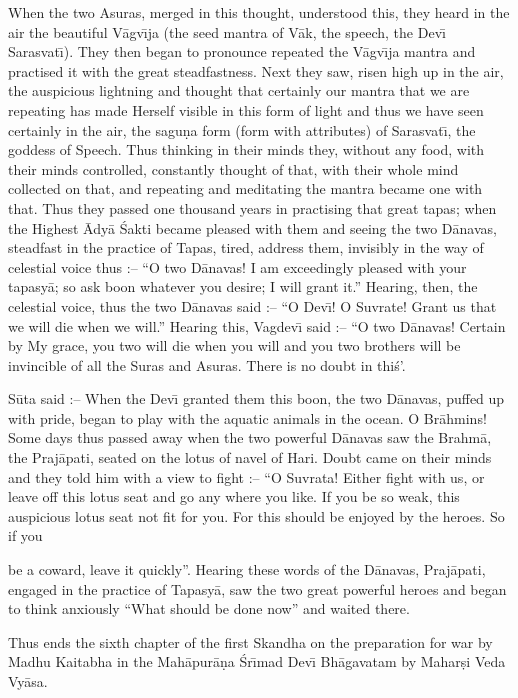 When the two Asuras, merged in this thought, understood this, they heard in the air the beautiful V\=agv\={\i}ja (the seed mantra of V\=ak, the speech, the Dev\={\i} Sarasvat\={\i}). They then began to pronounce repeated the V\=agv\={\i}ja mantra and practised it with the great steadfastness. Next they saw, risen high up in the air, the auspicious lightning and thought that certainly our mantra that we are repeating has made Herself visible in this form of light and thus we have seen certainly in the air, the sagu\d{n}a form (form with attributes) of Sarasvat\={\i}, the goddess of Speech. Thus thinking in their minds they, without any food, with their minds controlled, constantly thought of that, with their whole mind collected on that, and repeating and meditating the mantra became one with that. Thus they passed one thousand years in practising that great tapas; when the Highest \=Ady\=a \'Sakti became pleased with them and seeing the two D\=anavas, steadfast in the practice of Tapas, tired, address them, invisibly in the way of celestial voice thus :-- ``O two D\=anavas! I am exceedingly pleased with your tapasy\=a; so ask boon whatever you desire; I will grant it.'' Hearing, then, the celestial voice, thus the two D\=anavas said :-- ``O Dev\={\i}! O Suvrate! Grant us that we will die when we will.'' Hearing this, Vagdev\={\i} said :-- ``O two D\=anavas! Certain by My grace, you two will die when you will and you two brothers will be invincible of all the Suras and Asuras. There is no doubt in thi\'s'.

S\=uta said :-- When the Dev\={\i} granted them this boon, the two D\=anavas, puffed up with pride, began to play with the aquatic animals in the ocean. O Br\=ahmins! Some days thus passed away when the two powerful D\=anavas saw the Brahm\=a, the Praj\=apati, seated on the lotus of navel of Hari. Doubt came on their minds and they told him with a view to fight :-- ``O Suvrata! Either fight with us, or leave off this lotus seat and go any where you like. If you be so weak, this auspicious lotus seat not fit for you. For this should be enjoyed by the heroes. So if you

be a coward, leave it quickly''. Hearing these words of the D\=anavas, Praj\=apati, engaged in the practice of Tapasy\=a, saw the two great powerful heroes and began to think anxiously ``What should be done now'' and waited there.

Thus ends the sixth chapter of the first Skandha on the preparation for war by Madhu Kaitabha in the Mah\=apur\=a\d{n}a \'Sr\={\i}mad Dev\={\i} Bh\=agavatam by Mahar\d{s}i Veda Vy\=asa.



